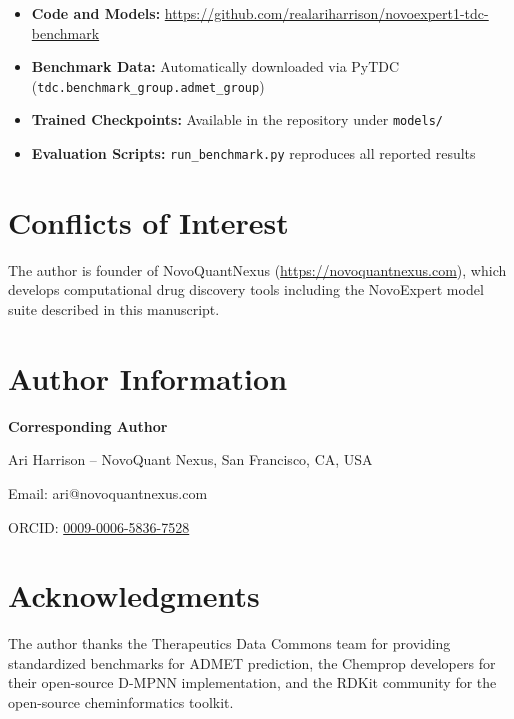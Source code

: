 \documentclass[11pt]{article}
\begin{document}
\begin{itemize}
    \item \textbf{Code and Models:} \url{https://github.com/realariharrison/novoexpert1-tdc-benchmark}
    \item \textbf{Benchmark Data:} Automatically downloaded via PyTDC (\texttt{tdc.benchmark\_group.admet\_group})
    \item \textbf{Trained Checkpoints:} Available in the repository under \texttt{models/}
    \item \textbf{Evaluation Scripts:} \texttt{run\_benchmark.py} reproduces all reported results
\end{itemize}

\section*{Conflicts of Interest}

The author is founder of NovoQuantNexus (\url{https://novoquantnexus.com}), which develops computational drug discovery tools including the NovoExpert model suite described in this manuscript.

\section*{Author Information}

\textbf{Corresponding Author}

Ari Harrison -- NovoQuant Nexus, San Francisco, CA, USA

Email: ari@novoquantnexus.com

ORCID: \href{https://orcid.org/0009-0006-5836-7528}{0009-0006-5836-7528}

\section*{Acknowledgments}

The author thanks the Therapeutics Data Commons team for providing standardized benchmarks for ADMET prediction, the Chemprop developers for their open-source D-MPNN implementation, and the RDKit community for the open-source cheminformatics toolkit.
\end{document}
